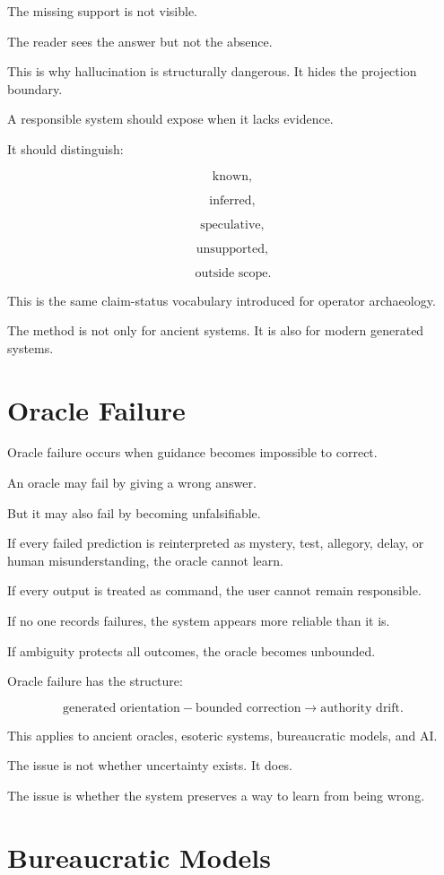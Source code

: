 \documentclass[11pt]{book}
\begin{document}
The missing support is not visible.

The reader sees the answer but not the absence.

This is why hallucination is structurally dangerous. It hides the projection boundary.

A responsible system should expose when it lacks evidence.

It should distinguish:

\[
\text{known},
\]

\[
\text{inferred},
\]

\[
\text{speculative},
\]

\[
\text{unsupported},
\]

\[
\text{outside scope}.
\]

This is the same claim-status vocabulary introduced for operator archaeology.

The method is not only for ancient systems. It is also for modern generated systems.

\section{Oracle Failure}

Oracle failure occurs when guidance becomes impossible to correct.

An oracle may fail by giving a wrong answer.

But it may also fail by becoming unfalsifiable.

If every failed prediction is reinterpreted as mystery, test, allegory, delay, or human misunderstanding, the oracle cannot learn.

If every output is treated as command, the user cannot remain responsible.

If no one records failures, the system appears more reliable than it is.

If ambiguity protects all outcomes, the oracle becomes unbounded.

Oracle failure has the structure:

\[
\text{generated orientation}
-
\text{bounded correction}
\rightarrow
\text{authority drift}.
\]

This applies to ancient oracles, esoteric systems, bureaucratic models, and AI.

The issue is not whether uncertainty exists. It does.

The issue is whether the system preserves a way to learn from being wrong.

\section{Bureaucratic Models}
\end{document}
